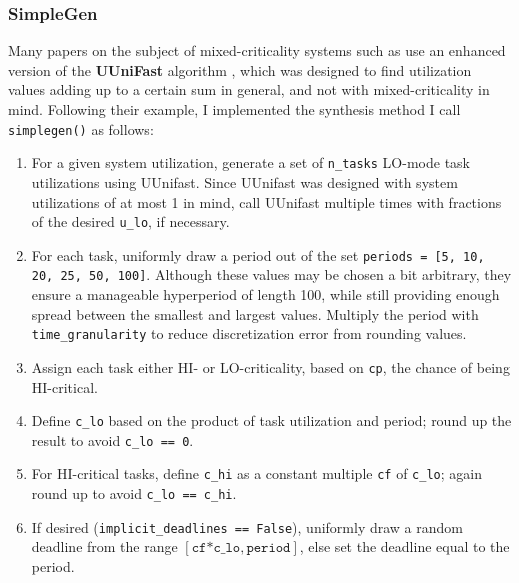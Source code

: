 \documentclass[a4paper,oneside]{csthesis}
\begin{document}
\subsubsection{SimpleGen}
Many papers on the subject of mixed-criticality systems such as \cite{baruah2011response} use an enhanced version of the \textbf{UUniFast} algorithm \cite{bini2005measuring}, which was designed to find utilization values adding up to a certain sum in general, and not with mixed-criticality in mind. Following their example, I implemented the synthesis method I call \texttt{simplegen()} as follows:
\begin{enumerate}
    \item For a given system utilization, generate a set of \texttt{n\_tasks} LO-mode task utilizations using UUnifast. Since UUnifast was designed with system utilizations of at most 1 in mind, call UUnifast multiple times with fractions of the desired \texttt{u\_lo}, if necessary.
    \item For each task, uniformly draw a period out of the set \texttt{periods = [5, 10, 20, 25, 50, 100]}. Although these values may be chosen a bit arbitrary, they ensure a manageable hyperperiod of length 100, while still providing enough spread between the smallest and largest values. Multiply the period with \texttt{time\_granularity} to reduce discretization error from rounding values.
    \item Assign each task either HI- or LO-criticality, based on \texttt{cp}, the chance of being HI-critical.
    \item Define \texttt{c\_lo} based on the product of task utilization and period; round up the result to avoid \texttt{c\_lo == 0}.
    \item For HI-critical tasks, define \texttt{c\_hi} as a constant multiple \texttt{cf} of \texttt{c\_lo}; again round up to avoid \texttt{c\_lo == c\_hi}.
    \item If desired (\texttt{implicit\_deadlines == False}), uniformly draw a random deadline from the range $[\texttt{cf*c\_lo}, \texttt{period}]$, else set the deadline equal to the period.
\end{enumerate}
\end{document}
